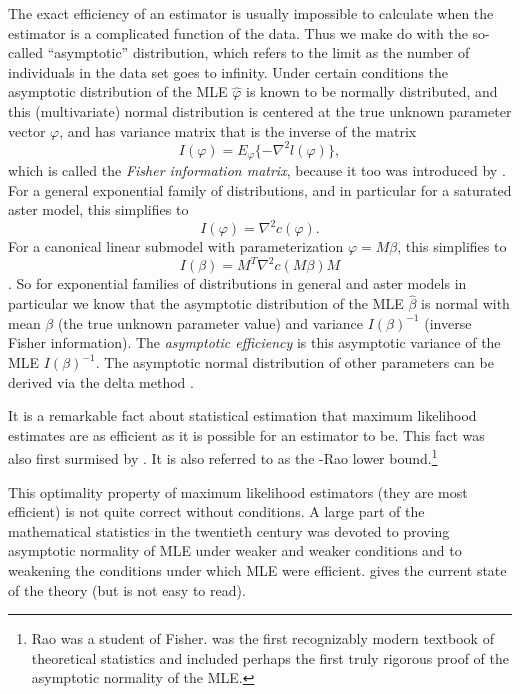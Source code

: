 \documentclass[11pt]{article}
\begin{document}
The exact efficiency of an estimator is usually impossible to calculate
when the estimator is a complicated function of the data.  Thus we make
do with the so-called ``asymptotic'' distribution, which refers to the limit
as the number of individuals in the data set goes to infinity.
Under certain conditions the asymptotic distribution of the MLE $\hat{\varphi}$
is known to be normally distributed,
and this (multivariate) normal distribution is centered
at the true unknown parameter vector $\varphi$, and has variance matrix that
is the inverse of the matrix
$$
   I(\varphi) = E_\varphi\{ - \nabla^2 l(\varphi) \},
$$
which is called the \emph{Fisher information matrix}, because it too was
introduced by \citet{fisher}.
For a general exponential family of distributions, and in particular for
a saturated aster model, this simplifies to
$$
   I(\varphi) = \nabla^2 c(\varphi).
$$
For a canonical linear submodel with parameterization $\varphi = M \beta$,
this simplifies to
\begin{equation} \label{eq:fisher-information}
   I(\beta) = M^T \nabla^2 c(M \beta) M
\end{equation}
\citep[Section~3.2]{gws}.
So for exponential families of distributions in general and aster models
in particular we know that the asymptotic distribution of the MLE
$\hat{\beta}$ is normal with mean $\beta$ (the true unknown parameter value)
and variance $I(\beta)^{-1}$ (inverse Fisher information).
The \emph{asymptotic efficiency} is this asymptotic variance of the MLE
$I(\beta)^{-1}$.  The asymptotic normal distribution of other parameters
can be derived via the delta method \citet[Section~3.3]{gws}.

It is a remarkable fact about statistical estimation that maximum likelihood
estimates are as efficient as it is possible for an estimator to be.  This
fact was also first surmised by \citet{fisher}.  It is also referred to as
the \citeauthor{cramer}-Rao lower bound.\footnote{Rao was a student of Fisher.
\citet{cramer} was the first recognizably modern textbook of theoretical
statistics and included perhaps the first truly rigorous proof of the
asymptotic normality of the MLE.}

This optimality
property of maximum likelihood estimators (they are most efficient) is not
quite correct without conditions.  A large part of the mathematical statistics
in the twentieth century was devoted to proving asymptotic normality of MLE
under weaker and weaker conditions and to weakening the conditions under
which MLE were efficient.  gives
the current state of the theory (but is not easy to read).
\end{document}
